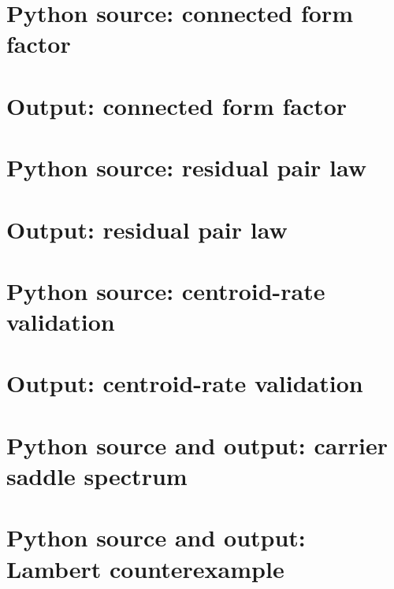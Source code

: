 \documentclass[11pt]{amsart}
\theoremstyle{definition}
\theoremstyle{remark}
\begin{document}
\section{Python source: connected form factor}


\section{Output: connected form factor}


\section{Python source: residual pair law}


\section{Output: residual pair law}


\section{Python source: centroid-rate validation}


\section{Output: centroid-rate validation}


\section{Python source and output: carrier saddle spectrum}



\section{Python source and output: Lambert counterexample}


\end{document}
